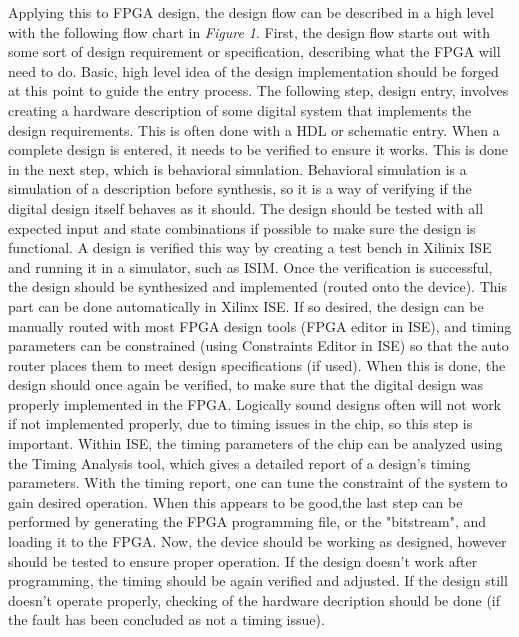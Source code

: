 \documentclass[12pt]{article}
\begin{document}
Applying this to FPGA design, the design flow can be described in a high level with the following flow chart in \textit{Figure 1}. First, the design flow starts out with some sort of design requirement or specification, describing what the FPGA will need to do. Basic, high level idea of the design implementation should be forged at this point to guide the entry process. The following step, design entry, involves creating a hardware description of some digital system that implements the design requirements. This is often done with a HDL or schematic entry. When a complete design is entered, it needs to be verified to ensure it works. This is done in the next step, which is behavioral simulation. Behavioral simulation is a simulation of a description before synthesis, so it is a way of verifying if the digital design itself behaves as it should. The design should be tested with all expected input and state combinations if possible to make sure the design is functional. A design is verified this way by creating a test bench in Xilinix ISE and running it in a simulator, such as ISIM. Once the verification is successful, the design should be synthesized and implemented (routed onto the device). This part can be done automatically in Xilinx ISE. If so desired, the design can be manually routed with most FPGA design tools (FPGA editor in ISE), and timing parameters can be constrained (using Constraints Editor in ISE) so that the auto router places them to meet design specifications (if used). When this is done, the design should once again be verified, to make sure that the digital design was properly implemented in the FPGA. Logically sound designs often will not work if not implemented properly, due to timing issues in the chip, so this step is important. Within ISE, the timing parameters of the chip can be analyzed using the Timing Analysis tool, which gives a detailed report of a design's timing parameters. With the timing report, one can tune the constraint of the system to gain desired operation. When this appears to be good,the last step can be performed by generating the FPGA programming file, or the "bitstream", and loading it to the FPGA. Now, the device should be working as designed, however should be tested to ensure proper operation. If the design doesn't work after programming, the timing should be again verified and adjusted. If the design still doesn't operate properly, checking of the hardware decription should be done (if the fault has been concluded as not a timing issue).
\FloatBarrier
\end{document}
